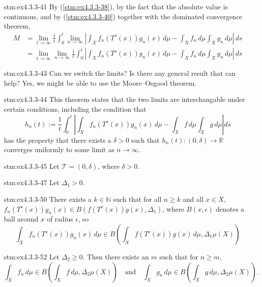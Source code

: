 \begin{statement}{stm:ex4.3.3-41}
By (\ref{stm:ex4.3.3-38}), by the fact that the absolute value is continuous, and by (\ref{stm:ex4.3.3-40}) together with the  dominated convergence theorem,
\begin{align*}
M
&= \lim_{t \to \infty} \frac{1}{t} \int_0^t 
\lim_{n \to \infty} 
\left| \int_X f_n(T^s(x)) g_n(x) \, d\mu 
- \int_X f_n \, d\mu \int_X g_n \, d\mu \right| \, ds \\
&= \lim_{t \to \infty} \lim_{n \to \infty} \frac{1}{t} \int_0^t 
\left| \int_X f_n(T^s(x)) g_n(x) \, d\mu 
- \int_X f_n \, d\mu \int_X g_n \, d\mu \right| \, ds
\end{align*}
\end{statement}

\begin{explanation}{stm:ex4.3.3-43}
Can we switch the limits? Is there any general result that can help? Yes, we might be able to use the Moore–Osgood theorem.
\end{explanation}

\begin{explanation}{stm:ex4.3.3-44}
This theorem states that the two limits are interchangable under certain conditions, including the condition that
$$
h_n(t) := \frac{1}{t} \int_0^t 
\left| \int_X f_n(T^s(x)) g_n(x) \, d\mu 
- \int_X f \, d\mu \int_X g \, d\mu \right| ds
$$
has the property that there exists a $\delta > 0$ such that $h_n(t): (0,\delta) \rightarrow \mathbb{R}$ converges uniformly to some limit as $n \rightarrow \infty$.
\end{explanation}

\begin{statement}{stm:ex4.3.3-45}
Let $\mathcal{T} = (0,\delta)$, where $\delta > 0$.
\end{statement}

\begin{statement}{stm:ex4.3.3-47}
Let $\Delta_1 > 0$.
\end{statement}

\begin{statement}{stm:ex4.3.3-50}
There exists a $ k \in \mathbb{N}$ such that for all $ n \geq k $ and all $x \in X$, $f_n(T^s(x)) g_n(x) \in B(f(T^s(x)) g(x), \Delta_1)$, where $B(x,\epsilon)$ denotes a ball around $x$ of radius $\epsilon$, so
\[
\int_X f_n(T^s(x)) g_n(x) \, d\mu 
\in B \left( \int_X f(T^s(x)) g(x) \, d\mu, \Delta_1 \mu(X) \right)
\]
\end{statement}

\begin{statement}{stm:ex4.3.3-52}
Let $\Delta_2 \geq 0$. Then there exists an $m$ such that for $n \geq m$,
\[
\int_X f_n \, d\mu \in B \left( \int_X f \, d\mu, \Delta_2 \mu(X) \right)
\quad \text{and} \quad 
\int_X g_n \, d\mu \in B \left( \int_X g \, d\mu, \Delta_2 \mu(X) \right).
\]
\end{statement}

